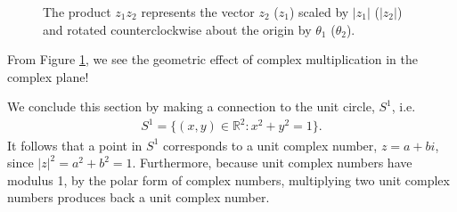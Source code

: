 \documentclass[12pt]{article}
\theoremstyle{plain}
\theoremstyle{definition}
\begin{document}
\begin{figure}[h]
    \caption{The product $z_1z_2$ represents the vector $z_2$ ($z_1$)  scaled by $|z_1|$ ($|z_2|$) and rotated counterclockwise about the origin by $\theta_1$ ($\theta_2$).}
    \label{fig:complexRot}
\end{figure}
From Figure \ref{fig:complexRot}, we see the geometric effect of  complex multiplication in the complex plane! 

We conclude this section by making a connection to the unit circle, $S^1$, i.e.
\begin{align*}
    S^1 = \{(x,y)\in\mathbb{R}^2 : x^2+y^2=1\}.
\end{align*}
It follows that a point in $S^1$ corresponds to a unit complex number, $z=a+bi$, since  $|z|^2=a^2+b^2=1$. Furthermore, because unit complex numbers have modulus 1, by the polar form of complex numbers, multiplying two unit complex numbers produces back a unit complex number.
\end{document}
